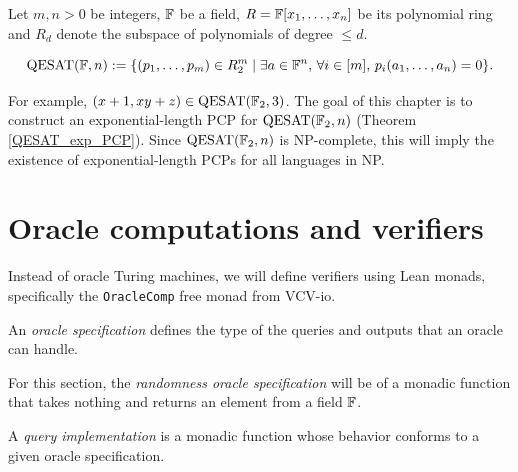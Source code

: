 \nocite{Chiesa2024-fopp-course}
\begin{definition}
\label{QESAT}
\leanok
Let \(m,n >0\) be integers, \(\mathbb{F}\) be a field, \(R = \mathbb{F}[x_{1},\dots,x_{n}]\) be its polynomial ring and \(R_{d}\) denote the subspace of polynomials of degree \(\leq d\).

\[
  \mathrm{QESAT}(\mathbb{F},n) :=
  \{ (p_1, \ldots, p_m) \in R^m_{2} \mid
    \exists a \in \mathbb{F}^n, \,
    \forall i \in [m], \,
    p_i(a_1, \ldots, a_n) = 0 \}.
\]
\end{definition}

For example, $(x + 1, xy + z) \in \mathrm{QESAT}(\mathbb{F}_2,3)$.
The goal of this chapter is to construct an exponential-length PCP for
\(\mathrm{QESAT}(\mathbb{F}_2,n)\) (Theorem \ref{QESAT_exp_PCP}). Since \(\mathrm{QESAT}(\mathbb{F}_2,n)\) is NP-complete, this will imply the existence of exponential-length PCPs for all languages in NP.

\section{Oracle computations and verifiers}
Instead of oracle Turing machines, we will define verifiers using Lean monads, specifically the \texttt{OracleComp} free monad from VCV-io.

\begin{definition}
\label{OracleSpec}
\leanok
An \emph{oracle specification} defines the type of the queries and outputs that an oracle can handle.
\end{definition}

\begin{definition}
\label{randOracleSpec}
\leanok
For this section, the \emph{randomness oracle specification} will be of a monadic function that takes
nothing and returns an element from a field \(\mathbb{F}\).
\end{definition}

\begin{definition}
\label{QueryImpl}
\leanok
A \emph{query implementation} is a monadic function whose behavior conforms to a given oracle specification.
\end{definition}


